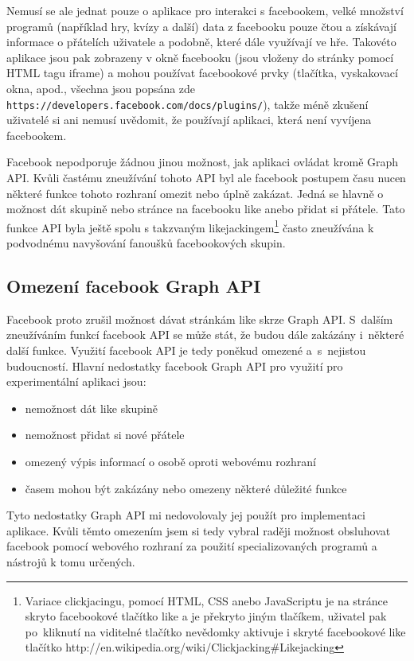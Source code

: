 \documentclass[thesis=M,czech]{FITthesis}[2013/05/10]
\begin{document}
Nemusí se ale jednat pouze o aplikace pro interakci s facebookem, velké množství programů (například hry, kvízy a další) data z facebooku pouze čtou a získávají informace o přátelích uživatele a podobně, které dále využívají ve hře. Takovéto aplikace jsou pak zobrazeny v okně facebooku (jsou vloženy do stránky pomocí HTML tagu iframe) a mohou používat facebookové prvky (tlačítka, vyskakovací okna, apod., všechna jsou popsána zde \verb|https://developers.facebook.com/docs/plugins/|), takže méně zkušení uživatelé si ani nemusí uvědomit, že používají aplikaci, která není vyvíjena facebookem. 

Facebook nepodporuje žádnou jinou možnost, jak aplikaci ovládat kromě Graph API. Kvůli častému zneužívání tohoto API byl ale facebook postupem času nucen některé funkce tohoto rozhraní omezit nebo úplně zakázat. Jedná se hlavně o možnost dát skupině nebo stránce na facebooku like anebo přidat si přátele. Tato funkce API byla ještě spolu s takzvaným likejackingem\footnote{Variace clickjacingu, pomocí HTML, CSS anebo JavaScriptu je na stránce skryto facebookové tlačítko like a je překryto jiným tlačíkem, uživatel pak po~kliknutí na viditelné tlačítko nevědomky aktivuje i skryté facebookové like tlačítko http://en.wikipedia.org/wiki/Clickjacking\#Likejacking} často zneužívána k podvodnému navyšování fanoušků facebookových skupin. 

\subsection{Omezení facebook Graph API}

Facebook proto zrušil možnost dávat stránkám like skrze Graph API. S~dalším zneužíváním funkcí facebook API se může stát, že budou dále zakázány i~některé další funkce. Využití facebook API je tedy poněkud omezené a~s~nejistou budoucností. Hlavní nedostatky facebook Graph API pro využití pro experimentální aplikaci jsou:

\begin{itemize}
  \item nemožnost dát like skupině
  \item nemožnost přidat si nové přátele
  \item omezený výpis informací o osobě oproti webovému rozhraní
  \item časem mohou být zakázány nebo omezeny některé důležité funkce
\end{itemize}

Tyto nedostatky Graph API mi nedovolovaly jej použít pro implementaci  aplikace. Kvůli těmto omezením jsem si tedy vybral raději možnost obsluhovat facebook pomocí webového rozhraní za použití specializovaných programů a nástrojů k tomu určených.
\end{document}
